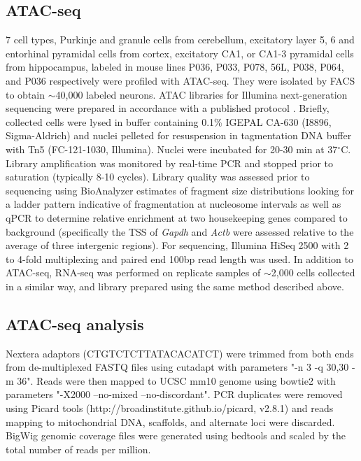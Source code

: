 \subsection{ATAC-seq}
7 cell types, Purkinje and granule cells from cerebellum, excitatory layer 5, 6 and entorhinal pyramidal cells from cortex, excitatory CA1, or CA1-3 pyramidal cells from hippocampus, labeled in mouse lines P036, P033, P078, 56L, P038, P064, and P036 respectively \citep[all from][]{Shima_2016} were profiled with ATAC-seq. They were isolated by FACS to obtain $\sim$40,000 labeled neurons. ATAC libraries for Illumina next-generation sequencing were prepared in accordance with a published protocol \citep{Buenrostro_2013}. Briefly, collected cells were lysed in buffer containing 0.1\% IGEPAL CA-630 (I8896, Sigma-Aldrich) and nuclei pelleted for resuspension in tagmentation DNA buffer with Tn5 (FC-121-1030, Illumina). Nuclei were incubated for 20-30 min at 37$^{\circ}$C. Library amplification was monitored by real-time PCR and stopped prior to saturation (typically 8-10 cycles). Library quality was assessed prior to sequencing using BioAnalyzer estimates of fragment size distributions looking for a ladder pattern indicative of fragmentation at nucleosome intervals as well as qPCR to determine relative enrichment at two housekeeping genes compared to background (specifically the TSS of \textit{Gapdh} and \textit{Actb} were assessed relative to the average of three intergenic regions). For sequencing, Illumina HiSeq 2500 with 2 to 4-fold multiplexing and paired end 100bp read length was used. In addition to ATAC-seq, RNA-seq was performed on replicate samples of $\sim$2,000 cells collected in a similar way, and library prepared using the same method described above.

\subsection{ATAC-seq analysis}
Nextera adaptors (CTGTCTCTTATACACATCT) were trimmed from both ends from de-multiplexed FASTQ files using cutadapt with parameters "-n 3 -q 30,30 -m 36". Reads were then mapped to UCSC mm10 genome using bowtie2 \citep{Langmead_2012} with parameters "-X2000 --no-mixed --no-discordant". PCR duplicates were removed using Picard tools (http://broadinstitute.github.io/picard, v2.8.1) and reads mapping to mitochondrial DNA, scaffolds, and alternate loci were discarded. BigWig genomic coverage files were generated using bedtools \citep{Quinlan_2010} and scaled by the total number of reads per million. 

